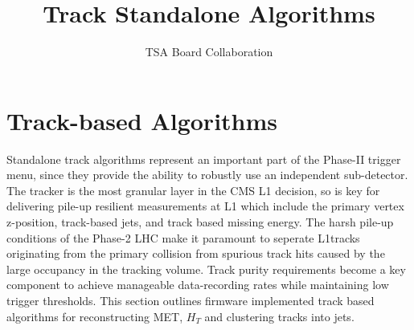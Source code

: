 \documentclass[12pt,a4paper]{article}
\author{TSA Board Collaboration}
\title{Track Standalone Algorithms}
\begin{document}
\section{ Track-based Algorithms}


Standalone track algorithms represent an important part of the Phase-II trigger menu, since they provide the ability to robustly use an independent sub-detector. The tracker is the most granular layer in the CMS L1 decision, so is key for delivering pile-up resilient measurements at L1 which include the primary vertex z-position, track-based jets, and track based missing energy. The harsh pile-up conditions of the Phase-2 LHC make it paramount to seperate L1tracks originating from the primary collision from spurious track hits caused by the large occupancy in the tracking volume. Track purity requirements become a key component to achieve manageable data-recording rates while maintaining low trigger thresholds. This section outlines firmware implemented track based algorithms for reconstructing MET, $H_{T}$ and clustering tracks into jets. 
\end{document}
